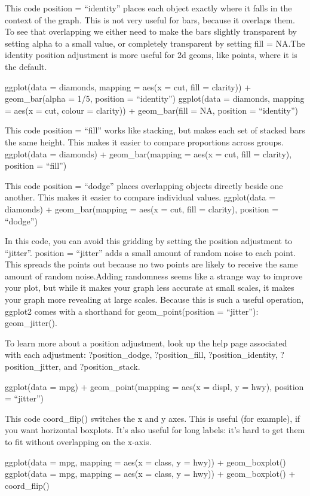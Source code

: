 \documentclass[
]{article}
\begin{document}
This code position = ``identity'' places each object exactly where it
falls in the context of the graph. This is not very useful for bars,
because it overlaps them. To see that overlapping we either need to make
the bars slightly transparent by setting alpha to a small value, or
completely transparent by setting fill = NA.The identity position
adjustment is more useful for 2d geoms, like points, where it is the
default.

ggplot(data = diamonds, mapping = aes(x = cut, fill = clarity)) +
geom\_bar(alpha = 1/5, position = ``identity'') ggplot(data = diamonds,
mapping = aes(x = cut, colour = clarity)) + geom\_bar(fill = NA,
position = ``identity'')

This code position = ``fill'' works like stacking, but makes each set of
stacked bars the same height. This makes it easier to compare
proportions across groups. ggplot(data = diamonds) + geom\_bar(mapping =
aes(x = cut, fill = clarity), position = ``fill'')

This code position = ``dodge'' places overlapping objects directly
beside one another. This makes it easier to compare individual values.
ggplot(data = diamonds) + geom\_bar(mapping = aes(x = cut, fill =
clarity), position = ``dodge'')

In this code, you can avoid this gridding by setting the position
adjustment to ``jitter''. position = ``jitter'' adds a small amount of
random noise to each point. This spreads the points out because no two
points are likely to receive the same amount of random noise.Adding
randomness seems like a strange way to improve your plot, but while it
makes your graph less accurate at small scales, it makes your graph more
revealing at large scales. Because this is such a useful operation,
ggplot2 comes with a shorthand for geom\_point(position = ``jitter''):
geom\_jitter().

To learn more about a position adjustment, look up the help page
associated with each adjustment: ?position\_dodge, ?position\_fill,
?position\_identity, ?position\_jitter, and ?position\_stack.

ggplot(data = mpg) + geom\_point(mapping = aes(x = displ, y = hwy),
position = ``jitter'')

This code coord\_flip() switches the x and y axes. This is useful (for
example), if you want horizontal boxplots. It's also useful for long
labels: it's hard to get them to fit without overlapping on the x-axis.

ggplot(data = mpg, mapping = aes(x = class, y = hwy)) + geom\_boxplot()
ggplot(data = mpg, mapping = aes(x = class, y = hwy)) + geom\_boxplot()
+ coord\_flip()
\end{document}
